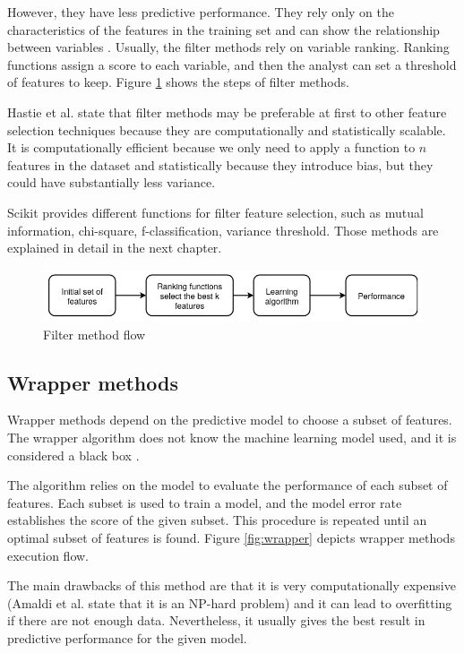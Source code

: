 However, they have less predictive performance.  They rely only on the characteristics of the features in the training set and can show the relationship between variables \cite{sanchez2007filter}.
Usually, the filter methods rely on variable ranking. Ranking functions assign a score to each variable, and then the analyst can set a threshold of features to keep. Figure \ref{fig:filter} shows the steps of filter methods.

Hastie et al. \cite{hastie2009elements} state that filter methods may be preferable at first to other feature selection techniques because they are computationally and statistically scalable.  It is computationally efficient because we only need to apply a function to $n$ features in the dataset and statistically because they introduce bias, but they could have substantially less variance.

Scikit provides different functions for filter feature selection, such as mutual information, chi-square, f-classification, variance threshold. Those methods are explained in detail in the next chapter.

\begin{figure}[!h]
	\centering
	\includegraphics[width=1.0\columnwidth]{filter2.png}
	\caption{Filter method flow}
	\label{fig:filter}
\end{figure}


\subsection{Wrapper methods}
\label{sec:wrapper}
Wrapper methods depend on the predictive model to choose a subset of features. The wrapper algorithm does not know the machine learning model used, and it is considered a black box \cite{kohavi1997wrappers}. 

The algorithm relies on the model to evaluate the performance of each subset of features. Each subset is used to train a model, and the model error rate establishes the score of the given subset. This procedure is repeated until an optimal subset of features is found. Figure \ref{fig:wrapper} depicts wrapper methods execution flow.

The main drawbacks of this method are that it is very computationally expensive (Amaldi et al. \cite{amaldi1998approximability} state that it is an NP-hard problem) and it can lead to overfitting if there are not enough data. Nevertheless, it usually gives the best result in predictive performance for the given model.

